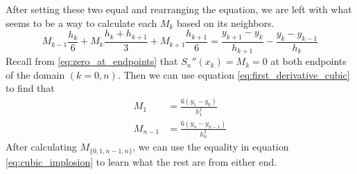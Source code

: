 \documentclass{article}
\begin{document}
After setting these two equal and rearranging the equation, we are left with what seems to be a way to calculate each $M_k$ based on its neighbors.
\begin{equation}
    M_{k-1}\frac{h_k}{6} + M_k\frac{h_k+h_{k+1}}{3} + M_{k+1}\frac{h_{k+1}}{6} = \frac{y_{k+1}-y_k}{h_{k+1}} - \frac{y_k-y_{k-1}}{h_k}
    \label{eq:cubic_implosion}
\end{equation}
Recall from \eqref{eq:zero_at_endpoints} that $S_n''(x_k)=M_k=0$ at both endpoints of the domain $(k=0, n)$. Then we can use equation \eqref{eq:first_derivative_cubic} to find that
\begin{align*}
    M_1     & = \frac{6(y_1-y_0)}{h_1^2}     \\
    M_{n-1} & = \frac{6(y_n-y_{n-1})}{h_n^2}
\end{align*}
After calculating $M_{\{0,1, n-1, n\}}$, we can use the equality in equation \eqref{eq:cubic_implosion} to learn what the rest are from either end.
\end{document}
